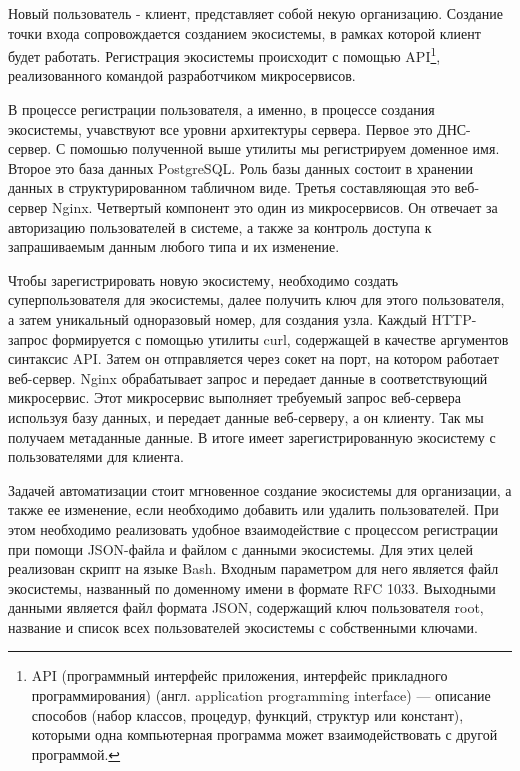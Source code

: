Новый пользователь - клиент, представляет собой некую организацию. Создание точки входа сопровождается созданием экосистемы, в рамках которой клиент будет работать. 
Регистрация экосистемы происходит с помощью API\footnote{API (программный интерфейс приложения, интерфейс прикладного программирования) (англ. application programming interface) --- описание способов (набор классов, процедур, функций, структур или констант), которыми одна компьютерная программа может взаимодействовать с другой программой.}, реализованного командой разработчиком микросервисов.

В процессе регистрации пользователя, а именно, в процессе создания экосистемы, учавствуют все уровни архитектуры сервера. Первое это ДНС-сервер. С помошью полученной выше утилиты мы регистрируем доменное имя. Второе это база данных PostgreSQL. Роль базы данных состоит в хранении данных в структурированном табличном виде. Третья составляющая это веб-сервер Nginx. Четвертый компонент это один из микросервисов. Он отвечает за авторизацию пользователей в системе, а также за контроль доступа к запрашиваемым данным любого типа и их изменение.

Чтобы зарегистрировать новую экосистему, необходимо создать суперпользователя для экосистемы, далее получить ключ для этого пользователя, а затем уникальный одноразовый номер, для создания узла. Каждый HTTP-запрос формируется с помощью утилиты curl, содержащей в качестве аргументов синтаксис API. Затем он отправляется через сокет на порт, на котором работает веб-сервер. Nginx обрабатывает запрос и передает данные в соответствующий микросервис. Этот микросервис выполняет требуемый запрос веб-сервера используя базу данных, и передает данные веб-серверу, а он клиенту. Так мы получаем метаданные данные. В итоге имеет зарегистрированную экосистему с пользователями для клиента.

Задачей автоматизации стоит мгновенное создание экосистемы для организации, а также ее изменение, если необходимо добавить или удалить пользователей. При этом необходимо реализовать удобное взаимодействие с процессом регистрации при помощи JSON-файла и файлом с данными экосистемы. 
Для этих целей реализован скрипт на языке Bash. Входным параметром для него является файл экосистемы, названный по доменному имени в формате RFC 1033. Выходными данными является файл формата JSON, содержащий ключ пользователя root, название и список всех пользователей экосистемы с собственными ключами.

